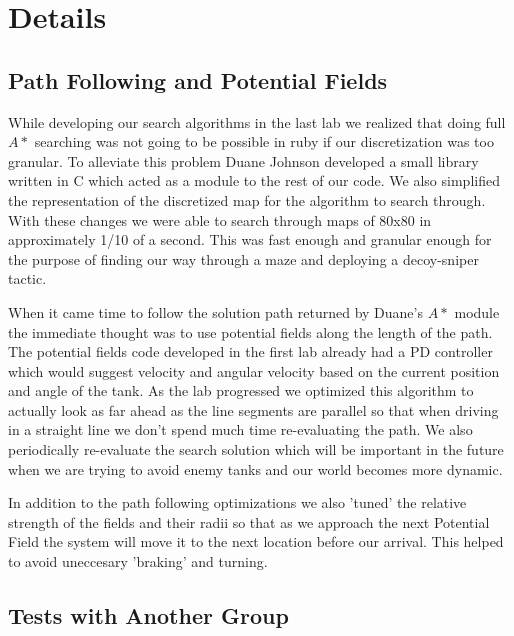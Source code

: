 \chapter{Details}\label{chap:details}
\section{Path Following and Potential Fields}
While developing our search algorithms in the last lab we realized that doing full $A*$ searching was not going to be possible in ruby if our discretization was too granular. To alleviate this problem Duane Johnson developed a small library written in C which acted as a module to the rest of our code.  We also simplified the representation of the discretized map for the algorithm to search through.  With these changes we were able to search through maps of 80x80 in approximately 1/10 of a second.  This was fast enough and granular enough for the purpose of finding our way through a maze and deploying a decoy-sniper tactic.
\par
When it came time to follow the solution path returned by Duane's $A*$ module the immediate thought was to use potential fields along the length of the path.  The potential fields code developed in the first lab already had a PD controller which would suggest velocity and angular velocity based on the current position and angle of the tank.  As the lab progressed we optimized this algorithm to actually look as far ahead as the line segments are parallel so that when driving in a straight line we don't spend much time re-evaluating the path.  We also periodically re-evaluate the search solution which will be important in the future when we are trying to avoid enemy tanks and our world becomes more dynamic.
\par
In addition to the path following optimizations we also 'tuned' the relative strength of the fields and their radii so that as we approach the next Potential Field the system will move it to the next location before our arrival.  This helped to avoid uneccesary 'braking' and turning.

\section{Tests with Another Group}
